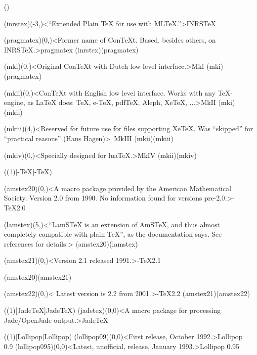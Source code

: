 \clearpage
\tograph*(){
	\tonode(inrstex)(-3,\layer)<“Extended Plain TeX for use with MLTeX.”>{INRS\TeX}
	\steplayer[-2]

	\tonode(pragmatex)(0,\layer)<Former name of ConTeXt. Based, besides others, on INRSTeX.>{pragmatex}
	\todraw(inrstex)(pragmatex)
	\steplayer[-2]

	\tonode(mki)(0,\layer)<Original ConTeXt with Dutch low level interface.>{\ConTeXt MkI}
	\todraw(mki)(pragmatex)
	\steplayer[-2]

	\tonode[\vip](mkii)(0,\layer)<ConTeXt with English low level interface. Works with any TeX-engine, as LaTeX does: TeX, e-TeX, pdfTeX, Aleph, XeTeX, ...>{\ConTeXt MkII}
	\todraw(mki)(mkii)
	\steplayer[-2]
	
	\tonode(mkiii)(4,\layer)<Reserved for future use for files supporting XeTeX. Was “skipped” for “practical reasons” (Hans Hagen)>{\ConTeXt\ MkIII}
	\todraw(mkii)(mkiii)
	\steplayer[-2]
	
	\tonode[\vip](mkiv)(0,\layer)<Specially designed for luaTeX.>{\ConTeXt MkIV}
	\todraw*(mkii)(mkiv)
}

\clearpage
\tograph(\tostruct(1)[\AMS-\TeX]{\AMS-\TeX}){
	\tonode(amstex20)(0,\layer)<A macro package provided by the American Mathematical Society. Version 2.0 from 1990. No information found for versions pre-2.0.>{\AMS-\TeX  2.0}
	\steplayer[-1]

	\tonode(lamstex)(5,\layer)<“LamSTeX{} is an extension of AmSTeX, and thus almost completely compatible with plain TeX”, as the documentation says. See references for details.>{}
	\todraw(amstex20)(lamstex)
	\steplayer[-1]

	\tonode(amstex21)(0,\layer)<Version 2.1 released 1991.>{\AMS-\TeX  2.1}

	\todraw(amstex20)(amstex21)
	\steplayer[-2]

	\tonode(amstex22)(0,\layer)< Latest version is 2.2 from 2001.>{\AMS-\TeX 2.2}
	\todraw(amstex21)(amstex22)
}

\tograph(\tostruct(1)[Jade\TeX]{Jade\TeX}){
	\tonode(jadetex)(0,0)<A macro package for processing Jade/OpenJade output.>{Jade\TeX}
}

\tograph(\tostruct(1)[Lollipop]{Lollipop}){
	\tonode(lollipop09)(0,0)<First release, October 1992.>{Lollipop 0.9}
	\steplayer
	\tonode(lollipop095)(0,0)<Latest, unofficial, release, January 1993.>{Lollipop 0.95}
}

